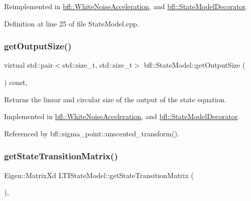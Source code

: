 Reimplemented in \mbox{\hyperlink{classbfl_1_1WhiteNoiseAcceleration_a819bd0d5510c9863272b422ab33b7adc}{bfl\+::\+White\+Noise\+Acceleration}}, and \mbox{\hyperlink{classbfl_1_1StateModelDecorator_a6825b807be82c66feb8bbb62d240490b}{bfl\+::\+State\+Model\+Decorator}}.



Definition at line 25 of file State\+Model.\+cpp.

\mbox{\label{classbfl_1_1StateModel_a6bf680b689389d959fc9ac46595e6dab}} 
\subsubsection{\texorpdfstring{get\+Output\+Size()}{getOutputSize()}}
{\footnotesize\ttfamily virtual std\+::pair$<$std\+::size\+\_\+t, std\+::size\+\_\+t$>$ bfl\+::\+State\+Model\+::get\+Output\+Size (\begin{DoxyParamCaption}{ }\end{DoxyParamCaption}) const\hspace{0.3cm}{\ttfamily [pure virtual]}, {\ttfamily [inherited]}}



Returns the linear and circular size of the output of the state equation. 



Implemented in \mbox{\hyperlink{classbfl_1_1WhiteNoiseAcceleration_ac3e447bf2f520b543c67d066f72423b7}{bfl\+::\+White\+Noise\+Acceleration}}, and \mbox{\hyperlink{classbfl_1_1StateModelDecorator_a2b2f00e6825e382587a2edbbba4569de}{bfl\+::\+State\+Model\+Decorator}}.



Referenced by bfl\+::sigma\+\_\+point\+::unscented\+\_\+transform().

\mbox{\label{classbfl_1_1LTIStateModel_a65d486fe684ebbd4970391809ccf2bd9}} 
\subsubsection{\texorpdfstring{get\+State\+Transition\+Matrix()}{getStateTransitionMatrix()}}
{\footnotesize\ttfamily Eigen\+::\+Matrix\+Xd L\+T\+I\+State\+Model\+::get\+State\+Transition\+Matrix (\begin{DoxyParamCaption}{ }\end{DoxyParamCaption})\hspace{0.3cm}{\ttfamily [override]}, {\ttfamily [virtual]}}



